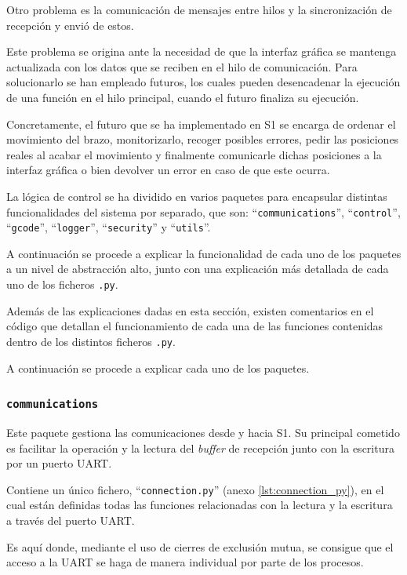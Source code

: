 Otro problema es la comunicación de mensajes entre hilos y la sincronización de recepción y envió de estos. 

Este problema se origina ante la necesidad de que la interfaz gráfica se mantenga actualizada con los datos que se reciben en el hilo de comunicación. Para solucionarlo se han empleado futuros, los cuales pueden desencadenar la ejecución de una función en el hilo principal, cuando el futuro finaliza su ejecución.

Concretamente, el futuro que se ha implementado en \ac{S1} se encarga de ordenar el movimiento del brazo, monitorizarlo, recoger posibles errores, pedir las posiciones reales al acabar el movimiento y finalmente comunicarle dichas posiciones a la interfaz gráfica o bien devolver un error en caso de que este ocurra.

La lógica de control se ha dividido en varios paquetes para encapsular distintas funcionalidades del sistema por separado, que son: ``\texttt{communications}'', ``\texttt{control}'', ``\texttt{gcode}'', ``\texttt{logger}'', ``\texttt{security}'' y ``\texttt{utils}''.

A continuación se procede a explicar la funcionalidad de cada uno de los paquetes a un nivel de abstracción alto, junto con una explicación más detallada de cada uno de los ficheros \texttt{.py}.

Además de las explicaciones dadas en esta sección, existen comentarios en el código que detallan el funcionamiento de cada una de las funciones contenidas dentro de los distintos ficheros \texttt{.py}.

A continuación se procede a explicar cada uno de los paquetes.

\subsubsection{\texttt{communications}}
Este paquete gestiona las comunicaciones desde y hacia \ac{S1}. Su principal cometido es facilitar la operación y la lectura del \textit{buffer} de recepción junto con la escritura por un puerto UART.

Contiene un único fichero, ``\texttt{connection.py}'' (anexo \ref{lst:connection_py}), en el cual están definidas todas las funciones relacionadas con la lectura y la escritura a través del puerto UART.

Es aquí donde, mediante el uso de cierres de exclusión mutua, se consigue que el acceso a la UART se haga de manera individual por parte de los procesos.

